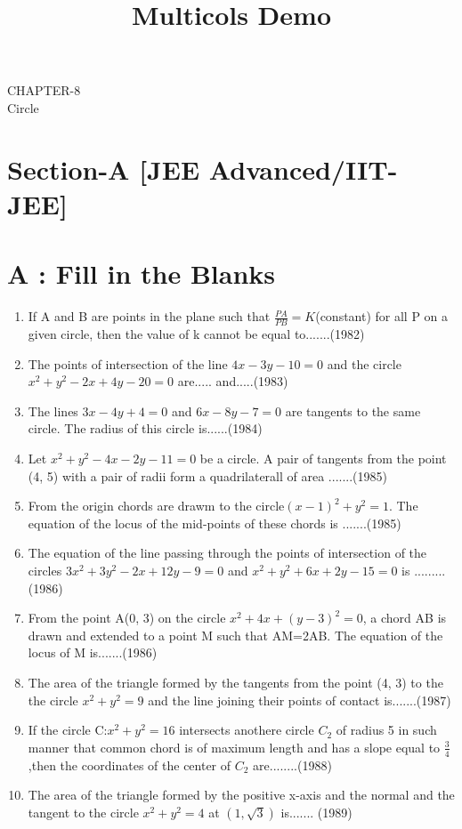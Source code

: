 \documentclass[12pt]{article}
\title{Multicols Demo}
\begin{document}
\begin{center}
\textbf\large{CHAPTER-8 \\ Circle}

\end{center}
\section*{Section-A    [JEE Advanced/IIT-JEE]}
\section*{A    :  Fill in the Blanks}
\begin{enumerate}
\item If A and B are points in the plane such that $\frac{PA}{PB}=K$(constant) for all P on a given circle, then the value of k cannot be equal to.......(1982)
\item The points of intersection of the line $4x-3y-10=0$ and the circle $x^2+y^2-2x+4y-20=0$ are..... and.....(1983)
\item The lines $3x-4y +4=0$ and $6x-8y-7=0$ are tangents to the same circle. The radius of this circle is......(1984)
\item Let $x^2+y^2-4x-2y-11=0$ be a circle. A pair of tangents from the point (4, 5) with a pair of radii form a quadrilaterall of area .......(1985)
\item From the origin chords are drawm to the circle$(x- 1)^2+y^2=1$. The equation of the locus of the mid-points of these chords is .......(1985)
\item The equation of the line passing through the points of intersection of the circles $3x^2+3y^2-2x+12y-9=0$ and $x^2+y^2+6x+2y-15=0$ is .........(1986)
\item From the point A(0, 3) on the circle $x^2+4x+(y-3)^2=0$, a chord AB is drawn and extended to a point M such that AM=2AB. The equation of the locus of M is.......(1986)
\item The area of the triangle formed by the tangents from the point (4, 3) to the the circle $x^2+y^2=9$ and the line joining their points of contact is.......(1987)
\item If the circle C:$x^2+y^2=16$ intersects anothere circle $C_2$ of radius 5 in such manner that common chord is of maximum length and has a slope equal to $\frac{3}{4}$,then the coordinates of the center of $C_2$ are........(1988)
\item The area of the triangle formed by the positive x-axis and the normal and the tangent to the circle $x^2+y^2=4$ at $(1,\sqrt{3})$ is....... (1989)

\end{enumerate}
\end{document}
